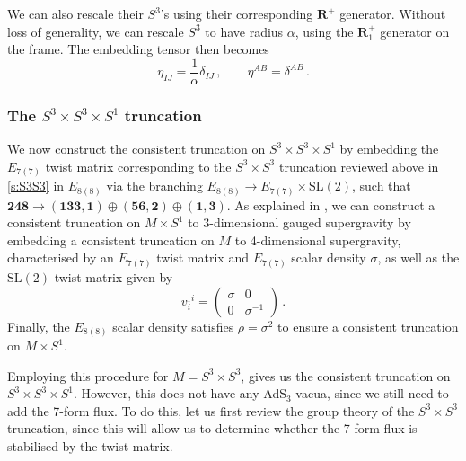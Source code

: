 \documentclass[a4paper, 11pt]{article}
\numberwithin{equation}{section}
\newcommand{\ov}[1]{\overline{#1}}
\newcommand{\SL}[1]{\mathrm{SL}( #1 )}
\newcommand{\EE}{\ensuremath{E_{8(8)}}\xspace}
\newcommand{\En}[1]{E_{#1(#1)}}
\newcommand{\+}{\oplus}
\begin{document}
We can also rescale their $S^3$'s using their corresponding $\mathbf{R}^+$ generator. Without loss of generality, we can rescale $S^3$ to have radius $\alpha$, using the $\mathbf{R}^+_1$ generator on the frame. The embedding tensor then becomes
\begin{equation}
	\eta_{IJ} = \frac{1}{\alpha} \delta_{IJ} \,, \qquad \eta^{AB} = \delta^{AB} \,.
\end{equation}

\subsubsection{The $S^3 \times S^3 \times S^1$ truncation} \label{s:S3S3S1}
We now construct the consistent truncation on $S^3 \times S^3 \times S^1$ by embedding the $\En{7}$ twist matrix corresponding to the $S^3 \times S^3$ truncation reviewed above in \ref{s:S3S3} in $\EE$ via the branching $\EE \rightarrow \En{7} \times \SL{2}$, such that $\mathbf{248} \rightarrow \mathbf{\left(133,1\right)} \oplus \mathbf{\left(56,2\right)} \oplus \mathbf{\left(1,3\right)}$. As explained in \cite{Galli:2022idq}, we can construct a consistent truncation on $M \times S^1$ to 3-dimensional gauged supergravity by embedding a consistent truncation on $M$ to 4-dimensional supergravity, characterised by an $\En{7}$ twist matrix and $\En{7}$ scalar density $\sigma$, as well as 
the $\SL{2}$ twist matrix given by
\begin{equation}
	v_{\ov{i}}{}^i = \begin{pmatrix}
		\sigma & 0 \\ 0 & \sigma^{-1}
	\end{pmatrix} \,.
\end{equation}
Finally, the $\EE$ scalar density satisfies $\rho = \sigma^2$ to ensure a consistent truncation on $M \times S^1$.

Employing this procedure for $M = S^3 \times S^3$, gives us the consistent truncation on $S^3 \times S^3 \times S^1$. However, this does not have any AdS$_3$ vacua, since we still need to add the 7-form flux. To do this, let us first review the group theory of the $S^3 \times S^3$ truncation, since this will allow us to determine whether the 7-form flux is stabilised by the twist matrix.
\end{document}
